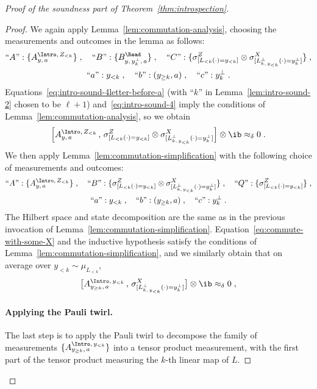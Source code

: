 \begin{proof}[Proof of the soundness part of Theorem~\ref{thm:introspection}]
\begin{proof}
    We again apply Lemma~\ref{lem:commutation-analysis}, choosing the
    measurements and outcomes in the lemma as follows:
    \begin{gather*}
      \text{``$A$''}: \{\aizk\}\;,\quad
      \text{``$B$''}: \{ \br[y,\, y^\perp_k,\, a] \}\;,\quad
      \text{``$C$''}: \{ \z[\Llk] \otimes \xLperpk \}\;, \\
      \text{``$a$''}: y_{< k} \;, \quad
      \text{``$b$''}: (y_{\geq k},a) \;, \quad
      \text{``$c$''}: y_k^\perp \;.
    \end{gather*}
    Equations~\eqref{eq:intro-sound-4letter-before-a} (with ``$k$'' in
    Lemma~\ref{lem:intro-sound-2} chosen to be $\ell+1$)
    and~\eqref{eq:intro-sound-4} imply the conditions of
    Lemma~\ref{lem:commutation-analysis}, so we obtain
    \begin{equation}\label{eq:commute-with-some-X}
      \Bigl[ \aizk \,,\,  \zLlk \otimes \xLperpk \Bigr] \otimes
      \ib \approx_\delta 0\;.
    \end{equation}
    We then apply Lemma~\ref{lem:commutation-simplification} with the following
    choice of measurements and outcomes:
    \begin{gather*}
      \text{``$A$''}: \{\aizk\}\;,\quad
      \text{``$B$''}: \{\zLlk \otimes \xLperpk \}\;, \quad
      \text{``$Q$''}: \{\zLlk \}\;, \\
      \text{``$a$''}: y_{< k} \;, \quad
      \text{``$b$''}: (y_{\geq k},a) \;, \quad
      \text{``$c$''}: y_k^\perp \;.
    \end{gather*}
    The Hilbert space and state decomposition are the same as in the previous
    invocation of Lemma~\ref{lem:commutation-simplification}.
    Equation~\eqref{eq:commute-with-some-X} and the inductive hypothesis satisfy
    the conditions of Lemma~\ref{lem:commutation-simplification}, and we
    similarly obtain that on average over $y_{< k} \sim \mu_{L_{<k}}$,
    \begin{equation}
      \label{eq:intro-sound-6}
      \bigl[ \aigek \,,\, \xLperpk \bigr] \otimes \ib
      \approx_\delta 0\;,
    \end{equation}

    \paragraph{Applying the Pauli twirl.}
    The last step is to apply the Pauli twirl to decompose the family of
    measurements $\{\aigek \}$ into a tensor product measurement, with the first
    part of the tensor product measuring the $k$-th linear map of $L$.


\end{proof}
\end{proof}
